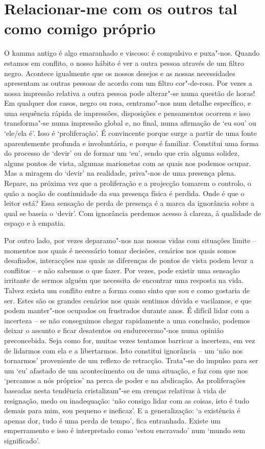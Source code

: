 \section{Relacionar-me com os outros tal como comigo próprio}

O kamma antigo é algo emaranhado e viscoso: é compulsivo e puxa"-nos. Quando
estamos em conflito, o nosso hábito é ver a outra pessoa através de um filtro
negro. Acontece igualmente que os nossos desejos e as nossas necessidades
apresentam as outras pessoas de acordo com um filtro cor"-de-rosa. Por vezes a
nossa impressão relativa a outra pessoa pode alterar"-se numa questão de horas!
Em qualquer dos casos, negro ou rosa, centramo"-nos num detalhe específico, e
uma sequência rápida de impressões, disposições e pensamentos ocorrem e isso
transforma"-se numa impressão global e, no final, numa afirmação de `eu sou' ou
`ele/ela é'. Isso é `proliferação'. É convincente porque surge a partir de uma
fonte aparentemente profunda e involuntária, e porque é familiar. Constitui uma
forma do processo de `devir' ou de formar um `eu', sendo que cria alguma
solidez, alguns pontos de vista, algumas marionetas com as quais nos podemos
ocupar. Mas a miragem do `devir' na realidade, priva"-nos de uma presença plena.
Repare, na próxima vez que a proliferação e a projecção tomarem o controlo, o
quão a noção de continuidade da sua presença física é perdida. Onde é que o
leitor está? Essa sensação de perda de presença é a marca da ignorância sobre a
qual se baseia o `devir'. Com ignorância perdemos acesso à clareza, à qualidade
de espaço e à empatia.

Por outro lado, por vezes deparamo"-nos nas nossas vidas com situações limite --
momentos nos quais é necessário tomar decisões, cenários nos quais somos
desafiados, interacções nas quais as diferenças de pontos de vista podem levar a
conflitos -- e não sabemos o que fazer. Por vezes, pode existir uma sensação
irritante de sermos alguém que necessita de encontrar uma resposta na vida.
Talvez exista um conflito entre a forma como sinto que sou e como gostaria de
ser. Estes são os grandes cenários nos quais sentimos dúvida e vacilamos, e que
podem manter"-nos ocupados ou frustrados durante anos. É difícil lidar com a
incerteza -- se não conseguimos chegar rapidamente a uma conclusão, podemos
deixar o assunto e ficar desatentos ou endurecermo"-nos numa opinião
preconcebida. Seja como for, muitas vezes tentamos barricar a incerteza, em vez
de lidarmos com ela e a libertarmos. Isto constitui ignorância -- um `não nos
tornarmos' proveniente de um reflexo de retracção. Trata"-se do impulso para ser
um `eu' afastado de um acontecimento ou de uma situação, e faz com que nos
`percamos a nós próprios' na perca de poder e na abdicação. As proliferações
baseadas nesta tendência cristalizam"-se em crenças relativas à vida de
resignação, medo ou inadequação: `não consigo lidar com as coisas, isto é tudo
demais para mim, sou pequeno e ineficaz'. E a generalização: `a existência é
apenas dor, tudo é uma perda de tempo', fica entranhada. Existe um emperramento
e isso é interpretado como `estou encravado' num `mundo sem significado'.

